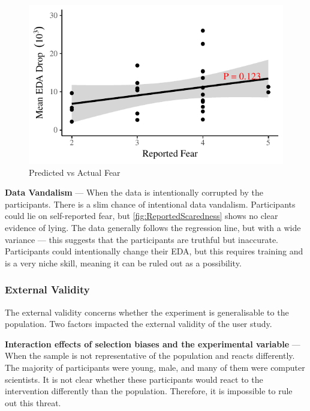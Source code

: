 \documentclass[12pt,a4paper]{article}\usepackage[]{graphicx}\usepackage[]{color}
\makeatletter
\def\maxwidth{ %
  \ifdim\Gin@nat@width>\linewidth
    \linewidth
  \else
    \Gin@nat@width
  \fi
}
\makeatother
\begin{document}
\begin{figure}
\vspace{-15pt}


{\centering \includegraphics[width=\maxwidth]{figure/ReportedScaredness-1} 

}



	\caption{Predicted vs Actual Fear}
	\label{fig:ReportedScaredness}
\end{figure}

\textbf{Data Vandalism} --- When the data is intentionally corrupted by the participants.
There is a slim chance of intentional data vandalism.
Participants could lie on self-reported fear, but \vref{fig:ReportedScaredness} shows no clear evidence of lying.
The data generally follows the regression line, but with a wide variance --- this suggests that the participants are truthful but inaccurate.
Participants could intentionally change their EDA, but this requires training and is a very niche skill, meaning it can be ruled out as a possibility.

\subsubsection{External Validity}
The external validity concerns whether the experiment is generalisable to the population.
Two factors impacted the external validity of the user study.

\textbf{Interaction effects of selection biases and the experimental variable} --- When the sample is not representative of the population and reacts differently.
The majority of participants were young, male, and many of them were computer scientists.
It is not clear whether these participants would react to the intervention differently than the population.
Therefore, it is impossible to rule out this threat.
\end{document}
